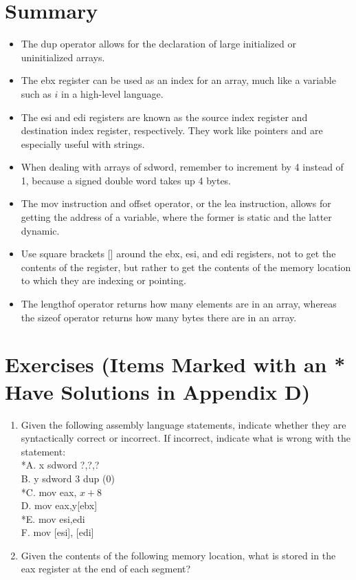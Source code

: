 \documentclass[10pt]{book}
\begin{document}
\section{Summary}
\begin{itemize}
  \item The dup operator allows for the declaration of large initialized or uninitialized arrays.
  \item The ebx register can be used as an index for an array, much like a variable such as $i$ in a high-level language.
  \item The esi and edi registers are known as the source index register and destination index register, respectively. They work like pointers and are especially useful with strings.
  \item When dealing with arrays of sdword, remember to increment by 4 instead of 1, because a signed double word takes up 4 bytes.
  \item The mov instruction and offset operator, or the lea instruction, allows for getting the address of a variable, where the former is static and the latter dynamic.
  \item Use square brackets [] around the ebx, esi, and edi registers, not to get the contents of the register, but rather to get the contents of the memory location to which they are indexing or pointing.
  \item The lengthof operator returns how many elements are in an array, whereas the sizeof operator returns how many bytes there are in an array.
\end{itemize}

\section{Exercises (Items Marked with an * Have Solutions in Appendix D)}
\begin{enumerate}
  \item Given the following assembly language statements, indicate whether they are syntactically correct or incorrect. If incorrect, indicate what is wrong with the statement:\\
*A. x sdword ?,?,?\\
B. y sdword 3 dup (0)\\
*C. mov eax, $x+8$\\
D. mov eax,y[ebx]\\
*E. mov esi,edi\\
F. mov [esi], [edi]
  \item Given the contents of the following memory location, what is stored in the eax register at the end of each segment?
\end{enumerate}
\end{document}
